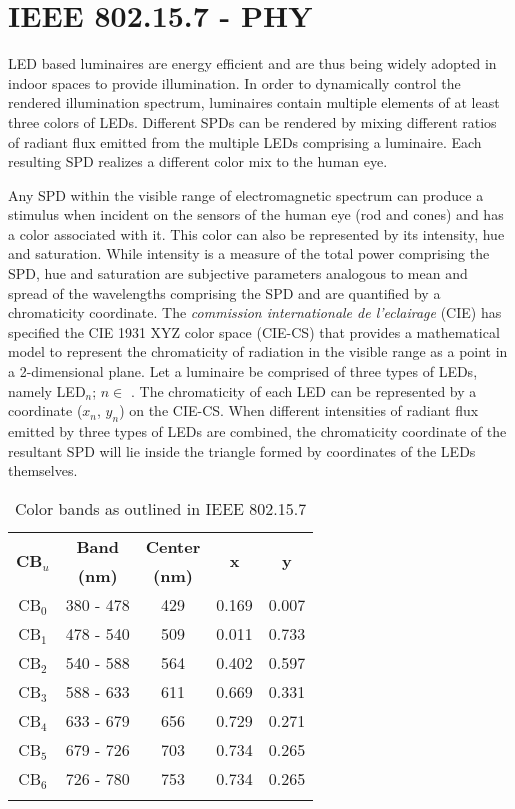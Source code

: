 \section{IEEE 802.15.7 - PHY }
\label{sec:ieeestd}
\graphicspath{{_MIMOColor/figures_csk/}}
LED based luminaires are energy efficient and are thus being widely adopted in indoor spaces to provide illumination. In order to dynamically control the rendered illumination spectrum, luminaires contain multiple elements of at least three colors of LEDs. Different SPDs can be rendered by mixing different ratios of radiant flux emitted from the multiple LEDs comprising a luminaire. Each resulting SPD realizes a different color mix to the human eye.

Any SPD within the visible range of electromagnetic spectrum can produce a stimulus when incident on the sensors of the human eye (rod and cones) and has a color associated with it. This color can also be represented by its intensity, hue and saturation. While intensity is a measure of the total power comprising the SPD, hue and saturation are subjective parameters analogous to mean and spread of the wavelengths comprising the SPD and are quantified by a chromaticity coordinate. The \textit{commission internationale de l'eclairage} (CIE) has specified the CIE 1931 XYZ color space (CIE-CS) that provides a mathematical model to represent the chromaticity of radiation in the visible range as a point in a 2-dimensional plane. Let a luminaire be comprised of three types of LEDs, namely LED$_{n}$; $n\in$ . The chromaticity of each LED can be represented by a coordinate ($x_{n}$, $y_{n}$) on the CIE-CS. When different intensities of radiant flux emitted by three types of LEDs are combined, the chromaticity coordinate of the resultant SPD will lie inside the triangle formed by coordinates of the LEDs themselves.

\renewcommand{\arraystretch}{1.1}
\begin{table}[t]
\centering
\begin{tabular}{|c|c|c|c|c|}
\hline
\multirow{2}{*}{\textbf{CB$_{u}$}} & \textbf{Band} & \textbf{Center} & \multirow{2}{*}{\textbf{x}} & \multirow{2}{*}{\textbf{y}}\\
 & \textbf{(nm)} & \textbf{(nm)} & & \\
\hline
CB$_{0}$ & 380 - 478 & 429 & 0.169 & 0.007\\
\hline
CB$_{1}$ & 478 - 540 & 509 & 0.011 & 0.733\\
\hline
CB$_{2}$ & 540 - 588 & 564 & 0.402 & 0.597\\
\hline
CB$_{3}$ & 588 - 633 & 611 & 0.669 & 0.331\\
\hline
CB$_{4}$ & 633 - 679 & 656 & 0.729 & 0.271\\
\hline
CB$_{5}$ & 679 - 726 & 703 & 0.734 & 0.265\\
\hline
CB$_{6}$ & 726 - 780 & 753 & 0.734 & 0.265\\
\hline
\multicolumn{5}{c}{ }
\end{tabular}
\caption{Color bands as outlined in IEEE 802.15.7}
\label{tCB}
\end{table}
\renewcommand{\arraystretch}{1.0}

